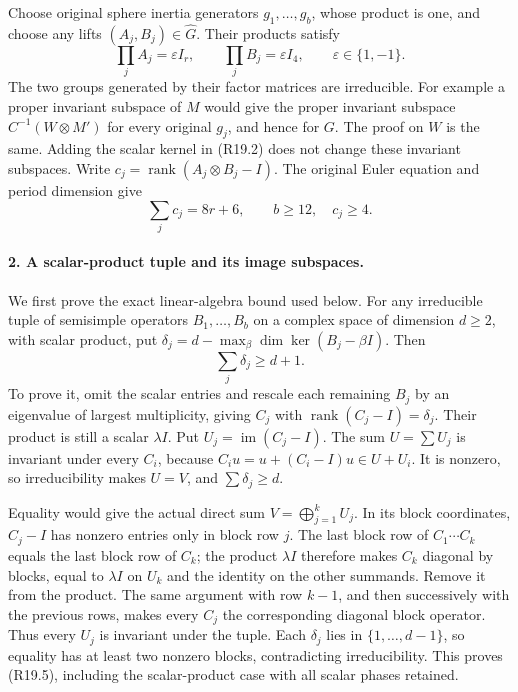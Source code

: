 Choose original sphere inertia generators \(g_1,\ldots,g_b\),
whose product is one, and choose any lifts
\((A_j,B_j)\in\widehat G\). Their products satisfy
\[
 \prod_jA_j=\varepsilon I_r,\qquad
 \prod_jB_j=\varepsilon I_4,\qquad\varepsilon\in\{1,-1\}.
                                                               \tag{R19.3}
\]
The two groups generated by their factor matrices are
irreducible. For example a proper invariant subspace of
\(M\) would give the proper invariant subspace
\(C^{-1}(W\otimes M')\) for every original \(g_j\),
and hence for \(G\). The proof on \(W\) is the same.
Adding the scalar kernel in (R19.2) does not change
these invariant subspaces. Write
\(c_j=\operatorname{rank}(A_j\otimes B_j-I)\). The
original Euler equation and period dimension give
\[
                  \sum_jc_j=8r+6,\qquad
                          b\ge12,\quad c_j\ge4.         \tag{R19.4}
\]

\paragraph{2. A scalar-product tuple and its image subspaces.}
We first prove the exact linear-algebra bound used below.
For any irreducible tuple of semisimple operators
\(B_1,\ldots,B_b\) on a complex space of dimension
\(d\ge2\), with scalar product, put
\(\delta_j=d-\max_\beta\dim\ker(B_j-\beta I)\).
Then
\[
                             \sum_j\delta_j\ge d+1.     \tag{R19.5}
\]
To prove it, omit the scalar entries and rescale each
remaining \(B_j\) by an eigenvalue of largest
multiplicity, giving \(C_j\) with
\(\operatorname{rank}(C_j-I)=\delta_j\).
Their product is still a scalar \(\lambda I\).
Put \(U_j=\operatorname{im}(C_j-I)\).
The sum \(U=\sum U_j\) is invariant under every
\(C_i\), because \(C_i u=u+(C_i-I)u\in U+U_i\).
It is nonzero, so irreducibility makes \(U=V\), and
\(\sum\delta_j\ge d\).

Equality would give the actual direct sum
\(V=\bigoplus_{j=1}^k U_j\). In its block coordinates,
\(C_j-I\) has nonzero entries only in block row \(j\).
The last block row of \(C_1\cdots C_k\) equals the
last block row of \(C_k\); the product \(\lambda I\)
therefore makes \(C_k\) diagonal by blocks, equal to
\(\lambda I\) on \(U_k\) and the identity on the
other summands. Remove it from the product. The same
argument with row \(k-1\), and then successively with
the previous rows, makes every \(C_j\) the corresponding
diagonal block operator. Thus every \(U_j\) is invariant
under the tuple. Each \(\delta_j\) lies in
\(\{1,\ldots,d-1\}\), so equality has at least two
nonzero blocks, contradicting irreducibility. This
proves (R19.5), including the scalar-product case with
all scalar phases retained.


